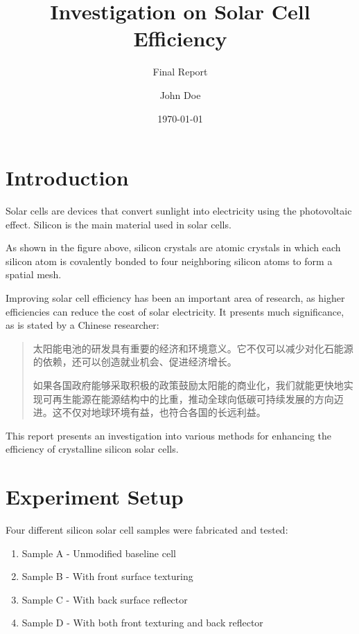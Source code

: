 \documentclass[]{report}
\title{Investigation on Solar Cell Efficiency}
\subtitle{Final Report}
\author{John Doe}
\date{\today}
\begin{document}
\maketitle

\section{Introduction}
Solar cells are devices that convert sunlight into electricity using the photovoltaic effect. Silicon is the main material used in solar cells. 
\begin{center}
\end{center}
As shown in the figure above, silicon crystals are atomic crystals in which each silicon atom is covalently bonded to four neighboring silicon atoms to form a spatial mesh. 

Improving solar cell efficiency has been an important area of research, as higher efficiencies can reduce the cost of solar electricity. It presents much significance, as is stated by a Chinese researcher: 

\begin{quote}
    太阳能电池的研发具有重要的经济和环境意义。它不仅可以减少对化石能源的依赖，还可以创造就业机会、促进经济增长。

    如果各国政府能够采取积极的政策鼓励太阳能的商业化，我们就能更快地实现可再生能源在能源结构中的比重，推动全球向低碳可持续发展的方向迈进。这不仅对地球环境有益，也符合各国的长远利益。
\end{quote}

This report presents an investigation into various methods for enhancing the efficiency of crystalline silicon solar cells. 

\section{Experiment Setup}
Four different silicon solar cell samples were fabricated and tested:

\begin{enumerate}
    \item Sample A - Unmodified baseline cell
    \item Sample B - With front surface texturing
    \item Sample C - With back surface reflector
    \item Sample D - With both front texturing and back reflector
\end{enumerate}
\end{document}
